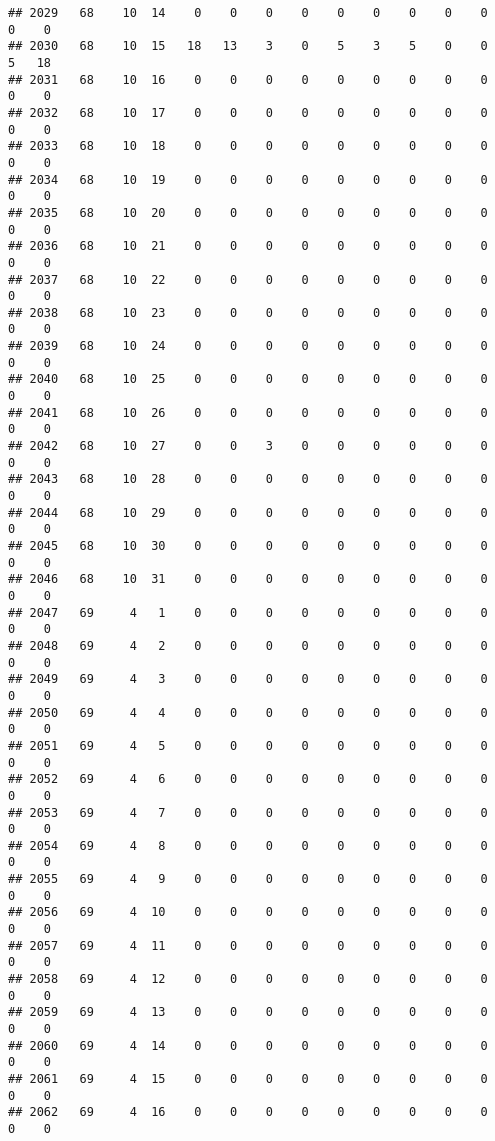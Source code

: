 \documentclass[]{article}
\begin{document}
\begin{verbatim}
## 2029   68    10  14    0    0    0    0    0    0    0    0    0    0    0
## 2030   68    10  15   18   13    3    0    5    3    5    0    0    5   18
## 2031   68    10  16    0    0    0    0    0    0    0    0    0    0    0
## 2032   68    10  17    0    0    0    0    0    0    0    0    0    0    0
## 2033   68    10  18    0    0    0    0    0    0    0    0    0    0    0
## 2034   68    10  19    0    0    0    0    0    0    0    0    0    0    0
## 2035   68    10  20    0    0    0    0    0    0    0    0    0    0    0
## 2036   68    10  21    0    0    0    0    0    0    0    0    0    0    0
## 2037   68    10  22    0    0    0    0    0    0    0    0    0    0    0
## 2038   68    10  23    0    0    0    0    0    0    0    0    0    0    0
## 2039   68    10  24    0    0    0    0    0    0    0    0    0    0    0
## 2040   68    10  25    0    0    0    0    0    0    0    0    0    0    0
## 2041   68    10  26    0    0    0    0    0    0    0    0    0    0    0
## 2042   68    10  27    0    0    3    0    0    0    0    0    0    0    0
## 2043   68    10  28    0    0    0    0    0    0    0    0    0    0    0
## 2044   68    10  29    0    0    0    0    0    0    0    0    0    0    0
## 2045   68    10  30    0    0    0    0    0    0    0    0    0    0    0
## 2046   68    10  31    0    0    0    0    0    0    0    0    0    0    0
## 2047   69     4   1    0    0    0    0    0    0    0    0    0    0    0
## 2048   69     4   2    0    0    0    0    0    0    0    0    0    0    0
## 2049   69     4   3    0    0    0    0    0    0    0    0    0    0    0
## 2050   69     4   4    0    0    0    0    0    0    0    0    0    0    0
## 2051   69     4   5    0    0    0    0    0    0    0    0    0    0    0
## 2052   69     4   6    0    0    0    0    0    0    0    0    0    0    0
## 2053   69     4   7    0    0    0    0    0    0    0    0    0    0    0
## 2054   69     4   8    0    0    0    0    0    0    0    0    0    0    0
## 2055   69     4   9    0    0    0    0    0    0    0    0    0    0    0
## 2056   69     4  10    0    0    0    0    0    0    0    0    0    0    0
## 2057   69     4  11    0    0    0    0    0    0    0    0    0    0    0
## 2058   69     4  12    0    0    0    0    0    0    0    0    0    0    0
## 2059   69     4  13    0    0    0    0    0    0    0    0    0    0    0
## 2060   69     4  14    0    0    0    0    0    0    0    0    0    0    0
## 2061   69     4  15    0    0    0    0    0    0    0    0    0    0    0
## 2062   69     4  16    0    0    0    0    0    0    0    0    0    0    0

\end{verbatim}
\end{document}

